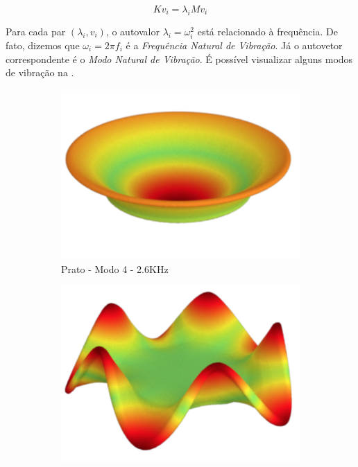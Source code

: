 \begin{equation}
	Kv_i = \lambda_i M v_i \label{eq:mode_scalar}
\end{equation}

Para cada par $(\lambda_i, v_i)$, o autovalor $\lambda_i = \omega_i^2$ está relacionado à frequência. De fato, dizemos que $\omega_i = 2\pi f_i$ é a \emph{Frequência Natural de Vibração}. Já o autovetor correspondente é o \emph{Modo Natural de Vibração}. É possível visualizar alguns modos de vibração na .

\begin{figure}[ht]
\centering
\begin{subfigure}{0.32\textwidth}
	\centering
	\includegraphics[height=0.15\textheight]{mathematicalbackground/modes/plate_4.png}
	\caption{Prato - Modo 4 - 2.6KHz}\label{fig:plates_4}
\end{subfigure}%
\begin{subfigure}{0.32\textwidth}
	\centering
	\includegraphics[height=0.15\textheight]{mathematicalbackground/modes/plate_9.png}

\end{subfigure}
\end{figure}
